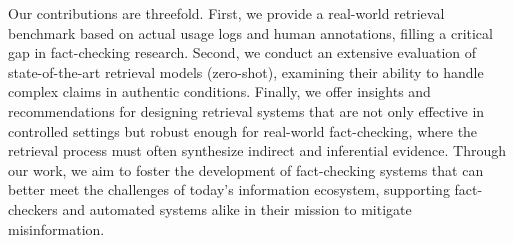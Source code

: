 Our contributions are threefold. First, we provide a real-world retrieval benchmark based on actual usage logs and human annotations, filling a critical gap in fact-checking research. Second, we conduct an extensive evaluation of state-of-the-art retrieval models (zero-shot), examining their ability to handle complex claims in authentic conditions. Finally, we offer insights and recommendations for designing retrieval systems that are not only effective in controlled settings but robust enough for real-world fact-checking, where the retrieval process must often synthesize indirect and inferential evidence. Through our work, we aim to foster the development of fact-checking systems that can better meet the challenges of today’s information ecosystem, supporting fact-checkers and automated systems alike in their mission to mitigate misinformation.
